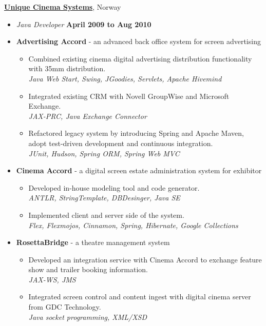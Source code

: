 \documentclass[10pt]{article}
\newenvironment{outerlist}[1][\enskip\textbullet]%
        {\begin{itemize}[#1]}{\end{itemize}%
         \vspace{-.6\baselineskip}}
\newcommand{\blankline}{\quad\pagebreak[2]}
\begin{document}
%
\href{http://www.uniquedigitalcinema.com/}{\textbf{Unique Cinema Systems}}, {Norway}
\begin{outerlist}

\item[] \textit{Java Developer}%
        \hfill \textbf{April 2009 to Aug 2010}
\item[] {\textbf{Advertising Accord} - an advanced back office system for screen advertising}
\begin{outerlist}
\item Combined existing cinema digital advertising distribution functionality with 35mm distribution.\\
\textit {Java Web Start, Swing, JGoodies, Servlets, Apache Hivemind}
\item Integrated existing CRM with Novell GroupWise and Microsoft Exchange.\\
\textit {JAX-PRC, Java Exchange Connector}
\item Refactored legacy system by introducing Spring and Apache Maven, adopt test-driven development and continuous integration.\\
\textit {JUnit, Hudson, Spring ORM, Spring Web MVC}
\end{outerlist}

\item[] {\textbf{Cinema Accord} - a digital screen estate administration system for exhibitor}
\begin{outerlist}
\item Developed in-house modeling tool and code generator.\\
\textit {ANTLR, StringTemplate, DBDesinger, Java SE}
\item Implemented client and server side of the system.\\
\textit {Flex, Flexmojos, Cinnamon, Spring, Hibernate, Google Collections}
\end{outerlist}

\item[] {\textbf{RosettaBridge} - a theatre management system}
\begin{outerlist}
\item Developed an integration service with Cinema Accord to exchange feature show and trailer booking information.\\
\textit {JAX-WS, JMS}
\item Integrated screen control and content ingest with digital cinema server from GDC Technology.\\
\textit {Java socket programming, XML/XSD}
\end{outerlist}

\end{outerlist}
\blankline
\end{document}
